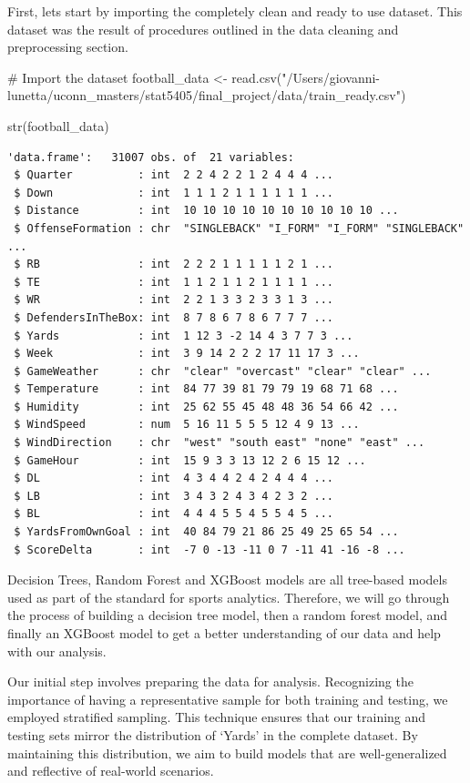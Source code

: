 \documentclass[
  super,
  preprint,
  3p]{elsarticle}
\newenvironment{Shaded}{\begin{snugshade}}{\end{snugshade}}
\newcommand{\CommentTok}[1]{\textcolor[rgb]{0.37,0.37,0.37}{#1}}
\newcommand{\FunctionTok}[1]{\textcolor[rgb]{0.28,0.35,0.67}{#1}}
\newcommand{\NormalTok}[1]{\textcolor[rgb]{0.00,0.23,0.31}{#1}}
\newcommand{\OtherTok}[1]{\textcolor[rgb]{0.00,0.23,0.31}{#1}}
\newcommand{\StringTok}[1]{\textcolor[rgb]{0.13,0.47,0.30}{#1}}
\begin{document}
First, lets start by importing the completely clean and ready to use
dataset. This dataset was the result of procedures outlined in the data
cleaning and preprocessing section.

\begin{Shaded}
\begin{Highlighting}[]
\CommentTok{\# Import the dataset}
\NormalTok{football\_data }\OtherTok{\textless{}{-}} \FunctionTok{read.csv}\NormalTok{(}\StringTok{"/Users/giovanni{-}lunetta/uconn\_masters/stat5405/final\_project/data/train\_ready.csv"}\NormalTok{)}

\FunctionTok{str}\NormalTok{(football\_data)}
\end{Highlighting}
\end{Shaded}

\begin{verbatim}
'data.frame':   31007 obs. of  21 variables:
 $ Quarter          : int  2 2 4 2 2 1 2 4 4 4 ...
 $ Down             : int  1 1 1 2 1 1 1 1 1 1 ...
 $ Distance         : int  10 10 10 10 10 10 10 10 10 10 ...
 $ OffenseFormation : chr  "SINGLEBACK" "I_FORM" "I_FORM" "SINGLEBACK" ...
 $ RB               : int  2 2 2 1 1 1 1 1 2 1 ...
 $ TE               : int  1 1 2 1 1 2 1 1 1 1 ...
 $ WR               : int  2 2 1 3 3 2 3 3 1 3 ...
 $ DefendersInTheBox: int  8 7 8 6 7 8 6 7 7 7 ...
 $ Yards            : int  1 12 3 -2 14 4 3 7 7 3 ...
 $ Week             : int  3 9 14 2 2 2 17 11 17 3 ...
 $ GameWeather      : chr  "clear" "overcast" "clear" "clear" ...
 $ Temperature      : int  84 77 39 81 79 79 19 68 71 68 ...
 $ Humidity         : int  25 62 55 45 48 48 36 54 66 42 ...
 $ WindSpeed        : num  5 16 11 5 5 5 12 4 9 13 ...
 $ WindDirection    : chr  "west" "south east" "none" "east" ...
 $ GameHour         : int  15 9 3 3 13 12 2 6 15 12 ...
 $ DL               : int  4 3 4 4 2 4 2 4 4 4 ...
 $ LB               : int  3 4 3 2 4 3 4 2 3 2 ...
 $ BL               : int  4 4 4 5 5 4 5 5 4 5 ...
 $ YardsFromOwnGoal : int  40 84 79 21 86 25 49 25 65 54 ...
 $ ScoreDelta       : int  -7 0 -13 -11 0 7 -11 41 -16 -8 ...
\end{verbatim}

Decision Trees, Random Forest and XGBoost models are all tree-based
models used as part of the standard for sports analytics. Therefore, we
will go through the process of building a decision tree model, then a
random forest model, and finally an XGBoost model to get a better
understanding of our data and help with our analysis.

Our initial step involves preparing the data for analysis. Recognizing
the importance of having a representative sample for both training and
testing, we employed stratified sampling. This technique ensures that
our training and testing sets mirror the distribution of `Yards' in the
complete dataset. By maintaining this distribution, we aim to build
models that are well-generalized and reflective of real-world scenarios.
\end{document}
